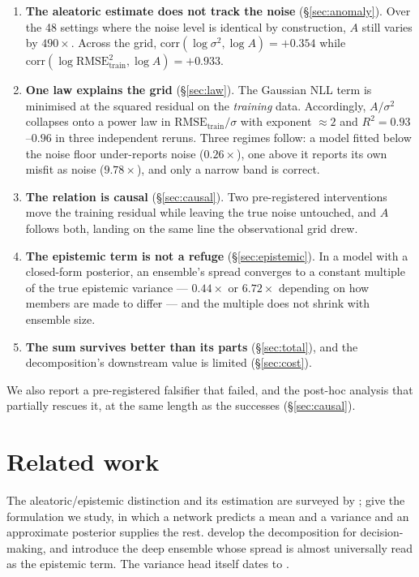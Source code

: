 \documentclass[10pt]{article}
\begin{document}
\begin{enumerate}
\item \textbf{The aleatoric estimate does not track the noise} (\S\ref{sec:anomaly}). Over
the 48 settings where the noise level is identical by construction, $A$ still varies by
$490\times$. Across the grid, $\mathrm{corr}(\log\sigma^2, \log A) = +0.354$ while
$\mathrm{corr}(\log \mathrm{RMSE}_{\mathrm{train}}^2, \log A) = +0.933$.

\item \textbf{One law explains the grid} (\S\ref{sec:law}). The Gaussian NLL term is
minimised at the squared residual on the \emph{training} data. Accordingly,
$A/\sigma^2$ collapses onto a power law in $\mathrm{RMSE}_{\mathrm{train}}/\sigma$ with
exponent $\approx 2$ and $R^2 = 0.93$--$0.96$ in three independent reruns. Three regimes
follow: a model fitted below the noise floor under-reports noise ($0.26\times$), one above it
reports its own misfit as noise ($9.78\times$), and only a narrow band is correct.

\item \textbf{The relation is causal} (\S\ref{sec:causal}). Two pre-registered interventions
move the training residual while leaving the true noise untouched, and $A$ follows both,
landing on the same line the observational grid drew.

\item \textbf{The epistemic term is not a refuge} (\S\ref{sec:epistemic}). In a model with a
closed-form posterior, an ensemble's spread converges to a constant multiple of the true
epistemic variance --- $0.44\times$ or $6.72\times$ depending on how members are made to
differ --- and the multiple does not shrink with ensemble size.

\item \textbf{The sum survives better than its parts} (\S\ref{sec:total}), and the
decomposition's downstream value is limited (\S\ref{sec:cost}).
\end{enumerate}

We also report a pre-registered falsifier that failed, and the post-hoc analysis that
partially rescues it, at the same length as the successes (\S\ref{sec:causal}).

\section{Related work}

The aleatoric/epistemic distinction and its estimation are surveyed by
\citet{hullermeier2021}; \citet{kendall2017} give the formulation we study, in which a
network predicts a mean and a variance and an approximate posterior supplies the rest.
\citet{depeweg2018} develop the decomposition for decision-making, and
\citet{lakshminarayanan2017} introduce the deep ensemble whose spread is almost universally
read as the epistemic term. The variance head itself dates to \citet{nix1994}.
\end{document}
